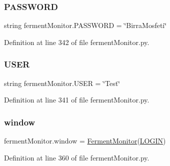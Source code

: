 \mbox{\label{namespaceferment_monitor_a51f37fb775290bb08bddcd5565421263}} 
\subsubsection{\texorpdfstring{PASSWORD}{PASSWORD}}
{\footnotesize\ttfamily string ferment\+Monitor.\+P\+A\+S\+S\+W\+O\+RD = \char`\"{}Birra\+Mosfeti\char`\"{}}



Definition at line 342 of file ferment\+Monitor.\+py.

\mbox{\label{namespaceferment_monitor_aa3dfafc218979411b8a36d3c0b13169e}} 
\subsubsection{\texorpdfstring{USER}{USER}}
{\footnotesize\ttfamily string ferment\+Monitor.\+U\+S\+ER = \char`\"{}Test\char`\"{}}



Definition at line 341 of file ferment\+Monitor.\+py.

\mbox{\label{namespaceferment_monitor_a6b7141e329fcc7042c5ea9350eaa59b6}} 
\subsubsection{\texorpdfstring{window}{window}}
{\footnotesize\ttfamily ferment\+Monitor.\+window = \mbox{\hyperlink{classferment_monitor_1_1_ferment_monitor}{Ferment\+Monitor}}(\mbox{\hyperlink{namespaceferment_monitor_ac0d7af2295b5bf29813e82d1152217c7}{L\+O\+G\+IN}})}



Definition at line 360 of file ferment\+Monitor.\+py.

